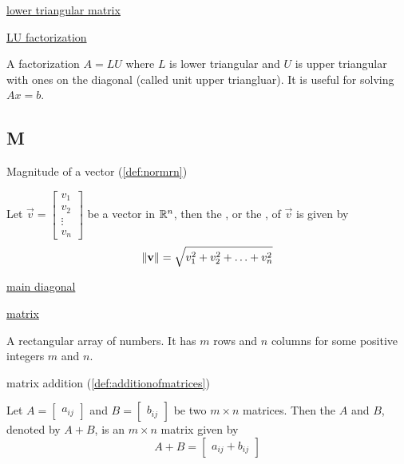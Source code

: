 \documentclass{ximera}
\begin{document}
\href{https://ximera.osu.edu/linearalgebradzv3/LinearAlgebraInteractiveIntro/MAT-0070/main}{lower triangular matrix}

\href{https://ximera.osu.edu/linearalgebradzv3/LinearAlgebraInteractiveIntro/MAT-0070/main}{LU factorization}
\begin{expandable}{}{}
    A factorization $A=LU$ where $L$ is lower triangular and $U$ is upper triangular with ones on the diagonal (called unit upper triangluar).  It is useful for solving $Ax=b$.
\end{expandable}

\subsection*{M}
Magnitude of a vector (\ref{def:normrn})
\begin{expandable}{}{}
Let $\vec{v}=\begin{bmatrix}v_1\\ v_2\\ \vdots \\v_n\end{bmatrix}$ be a vector in $\mathbb{R}^n$, then the , or the , of $\vec{v}$ is given by
$$  \left\lVert\mathbf{v}\right\rVert=\sqrt{v_1^2+v_2^2+\ldots +v_n^2}$$
\end{expandable}

\href{https://ximera.osu.edu/linearalgebradzv3/LinearAlgebraInteractiveIntro/MAT-0010/main}{main diagonal}
    
\href{https://ximera.osu.edu/linearalgebradzv3/LinearAlgebraInteractiveIntro/MAT-0010/main}{matrix}
\begin{expandable}{}{}
    A rectangular array of numbers.  It has $m$ rows and $n$ columns for some positive integers $m$ and $n$.
\end{expandable}

matrix addition (\ref{def:additionofmatrices})
\begin{expandable}{}{}
    Let $A=\begin{bmatrix} a_{ij}\end{bmatrix} $ and $B=\begin{bmatrix} b_{ij}\end{bmatrix}$ be two
$m\times n$ matrices. Then the  $A$ and $B$, denoted by $A+B$,  is an $m \times n$
matrix  given by 
$$A+B=\begin{bmatrix}a_{ij}+b_{ij}\end{bmatrix}$$
\end{expandable}
\end{document}
